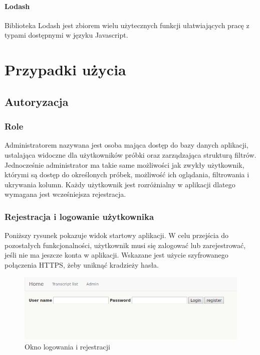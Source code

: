 \documentclass[a4paper,12pt,twoside]{article}
\begin{document}
\paragraph{Lodash} Biblioteka Lodash \cite{lodash} jest zbiorem wielu użytecznych funkcji ułatwiających pracę z typami dostępnymi w języku Javascript. 
  
\newpage
\section{Przypadki użycia}
\subsection{Autoryzacja} 
\subsubsection{Role}
Administratorem nazywana jest osoba mająca dostęp do bazy danych aplikacji, ustalająca
widoczne dla użytkowników próbki oraz zarządzająca strukturą filtrów. 
Jednocześnie administrator ma takie same możliwości jak zwykły użytkownik, którymi są dostęp do określonych próbek, możliwość ich oglądania, filtrowania i  ukrywania kolumn. 
Każdy użytkownik jest rozróżnialny w aplikacji dlatego wymagana jest wcześniejsza rejestracja.
 
\subsubsection{Rejestracja i logowanie użytkownika}
Poniższy rysunek pokazuje widok startowy aplikacji. W celu przejścia do 
pozostałych funkcjonalności, użytkownik musi się zalogować lub zarejestrować, jeśli nie ma jeszcze 
konta w aplikacji. Wskazane jest użycie szyfrowanego połączenia HTTPS, żeby uniknąć 
kradzieży hasła.

\begin{figure}[h!]
  \includegraphics[width=\linewidth]{obrazy/aplikacja/login.png}
  \caption{Okno logowania i rejestracji}
  \label{fig:loginpic}
\end{figure}
\end{document}
